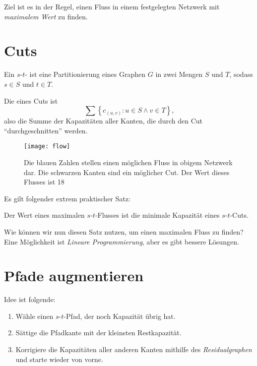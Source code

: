 Ziel ist es in der Regel, einen Fluss in einem festgelegten Netzwerk mit \emph{maximalem Wert} zu finden.

\section{Cuts}

\begin{definition}[Cut]
  Ein \( s \)-\( t \)- ist eine Partitionierung eines Graphen \( G \) in zwei Mengen \( S \) und \( T \), sodass \( s \in S \) und \( t \in T \).

  Die  eines Cuts ist
  \begin{equation*}
    \sum\left \{ c_{(u,v)} : u \in S \wedge v \in T \right \}\text{,}
  \end{equation*}
  also die Summe der Kapazitäten aller Kanten, die durch den Cut ``durchgeschnitten'' werden.
\end{definition}

\begin{figure}[H]
  \texttt{[image: flow]}
  \caption{Die blauen Zahlen stellen einen möglichen Fluss in obigem Netzwerk dar. Die schwarzen Kanten sind ein möglicher Cut. Der Wert dieses Flusses ist 18}
\end{figure}

Es gilt folgender extrem praktischer Satz:

\begin{theorem}
  Der Wert eines maximalen \( s \)-\( t \)-Flusses ist die minimale Kapazität eines \( s \)-\( t \)-Cuts.
\end{theorem}

Wie können wir nun diesen Satz nutzen, um einen maximalen Fluss zu finden? Eine Möglichkeit ist \emph{Lineare Programmierung}, aber es gibt bessere Lösungen.

\section{Pfade augmentieren}

Idee ist folgende:
\begin{enumerate}
  \item Wähle einen \( s \)-\( t \)-Pfad, der noch Kapazität übrig hat.
  \item Sättige die Pfadkante mit der kleinsten Restkapazität.
  \item Korrigiere die Kapazitäten aller anderen Kanten mithilfe des \emph{Residualgraphen} und starte wieder von vorne.
\end{enumerate}

